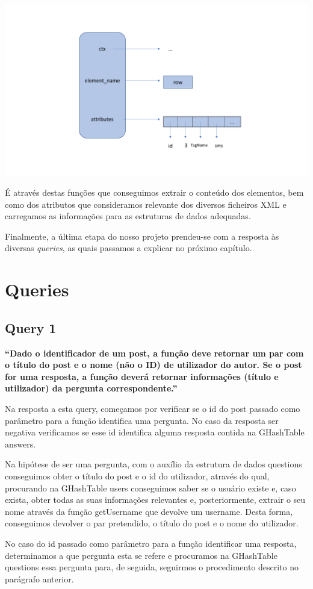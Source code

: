 \documentclass[a4paper]{report}
\begin{document}
\includegraphics[scale=0.4]{xmlelements.pdf}

É através destas funções que conseguimos extrair o conteúdo dos elementos, bem como dos
atributos que consideramos relevante dos diversos ficheiros XML e carregamos as informações
para as estruturas de dados adequadas.

Finalmente, a última etapa do nosso projeto prendeu-se com a resposta às diversas
\textit{queries}, as quais passamos a explicar no próximo capítulo.

\section{Queries}
\label{sec:queries}

\subsection*{Query 1}
\label{sec:query1}

\textbf{“Dado o identificador de um post, a função deve retornar
um par com o título do post e o nome (não o ID) de utilizador do autor. Se o post
for uma resposta, a função deverá retornar informações (título e utilizador)
da pergunta correspondente.”}


Na resposta a esta query, começamos por verificar se o id do post passado como
parâmetro  para a função identifica uma pergunta. No caso da resposta ser negativa
verificamos se esse id identifica alguma resposta contida na GHashTable answers. \par
Na hipótese de ser uma pergunta, com o auxílio da estrutura de dados questions
conseguimos obter o título do post e o id do utilizador, através do qual, procurando
na GHashTable users conseguimos saber se o usuário existe e, caso exista, obter
todas as suas informações relevantes e, posteriormente, extrair o seu nome através
da função getUsername que devolve um username. Desta forma, conseguimos devolver o par
pretendido, o título do post e o nome do utilizador. \par
No caso do id passado como parâmetro para a função identificar uma resposta, determinamos
a que pergunta esta se refere e procuramos na GHashTable questions essa pergunta
para, de seguida, seguirmos o procedimento descrito no parágrafo anterior.
\end{document}
